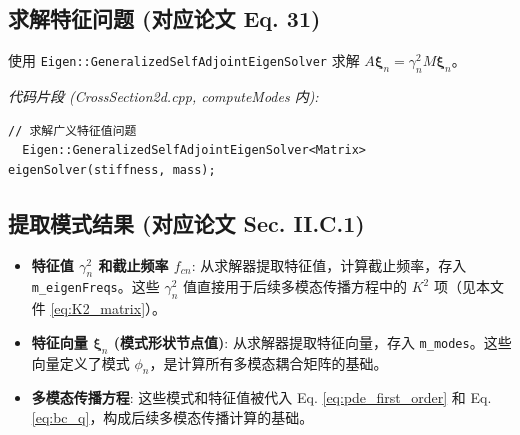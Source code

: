 \documentclass{ctexart}
\begin{document}
\subsection{求解特征问题 (对应论文 Eq. 31)}
使用 \texttt{Eigen::GeneralizedSelfAdjointEigenSolver} 求解 $A \boldsymbol{\xi}_n = \gamma_n^2 M \boldsymbol{\xi}_n$。

\textit{代码片段 (CrossSection2d.cpp, computeModes 内):}
\begin{lstlisting}[caption={求解广义特征值问题}, label={lst:solver}]
  // 求解广义特征值问题
  Eigen::GeneralizedSelfAdjointEigenSolver<Matrix> eigenSolver(stiffness, mass);
\end{lstlisting}
\subsection{提取模式结果 (对应论文 Sec. II.C.1)}
\begin{itemize}
    \item \textbf{特征值 $\gamma_n^2$ 和截止频率 $f_{cn}$}: 从求解器提取特征值，计算截止频率，存入 \texttt{m\_eigenFreqs}。这些 $\gamma_n^2$ 值直接用于后续多模态传播方程中的 $K^2$ 项（见本文件 \eqref{eq:K2_matrix}）。
    \item \textbf{特征向量 $\boldsymbol{\xi}_n$ (模式形状节点值)}: 从求解器提取特征向量，存入 \texttt{m\_modes}。这些向量定义了模式 $\phi_n$，是计算所有多模态耦合矩阵的基础。
    \item \textbf{多模态传播方程}: 这些模式和特征值被代入 Eq. \eqref{eq:pde_first_order} 和 Eq. \eqref{eq:bc_q}，构成后续多模态传播计算的基础。
\end{itemize}
\end{document}
